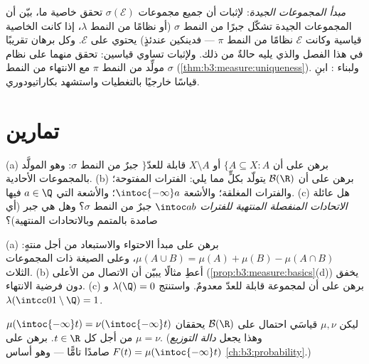 \begin{method}\label{met:b3:measure:goodsets}
\emph{مبدأ المجموعات الجيدة}: لإثبات أن جميع مجموعات $\sigma(\mathcal E)$
تحقق خاصية ما، بيّن أن المجموعات الجيدة تشكّل جبرًا من النمط
$\sigma$ (أو نظامًا من النمط $\lambda$، إذا كانت الخاصية قياسية
وكانت $\mathcal E$ نظامًا من النمط $\pi$ --- فدينكين عندئذٍ)
يحتوي على $\mathcal E$. وكل برهان تقريبًا في هذا الفصل والذي
يليه حالةٌ من ذلك. ولإثبات تساوي قياسين: تحقق منهما على نظام
مولِّد من النمط $\pi$ مع الانتهاء من النمط $\sigma$
(\cref{thm:b3:measure:uniqueness}). ولبناء : ابنِ قياسًا خارجيًا بالتغطيات
واستشهد بكاراتيودوري.
\end{method}

\section{تمارين}

\begin{exercise}[$\star$]\label{exo:b3:measure:1}
(a) برهن على أن $\{A \subseteq X : A$ أو $X\setminus A$ قابلة للعدّ$\}$ جبرٌ من
النمط $\sigma$: وهو المولَّد بالمجموعات الأحادية.
(b) برهن على أن $\mathcal B(\R)$ يتولّد بكلٍّ مما يلي: الفترات
المفتوحة؛ والفترات المغلقة؛ والأشعة $\intoc{-\infty}a$؛ والأشعة التي
$a \in \Q$ فيها.
(c) هل عائلة \emph{الاتحادات المنفصلة المنتهية للفترات}
$\intoc ab$ جبرٌ من النمط $\sigma$؟ وهل هي جبر (أي صامدة
بالمتمم وبالاتحادات المنتهية)؟
\end{exercise}

\begin{exercise}[$\star$]\label{exo:b3:measure:2}
(a) برهن على مبدأ الاحتواء والاستبعاد من أجل  منتهٍ: $\mu(A\cup
B) = \mu(A) + \mu(B) - \mu(A\cap B)$،
وعلى الصيغة ذات المجموعات الثلاث.
(b) أعطِ مثالًا يبيّن أن الاتصال من الأعلى (\cref{prop:b3:measure:basics}(d))
يخفق دون فرضية الانتهاء.
(c) برهن على أن  لمجموعة قابلة للعدّ معدومٌ. واستنتج $\lambda(\Q) = 0$
و $\lambda(\intcc01\setminus\Q) =
1$.
\end{exercise}

\begin{exercise}[$\star\star$]\label{exo:b3:measure:3}
ليكن $\mu, \nu$ قياسَي احتمال على $\mathcal B(\R)$ يحققان
$\mu(\intoc{-\infty}t) = \nu(\intoc{-\infty}t)$ من أجل كل $t \in \R$. برهن على $\mu = \nu$. (وهذا يجعل
\emph{دالة التوزيع} $F(t) = \mu(\intoc{-\infty}t)$ صامدًا تامًّا --- وهو أساس
\cref{ch:b3:probability}.)
\end{exercise}

